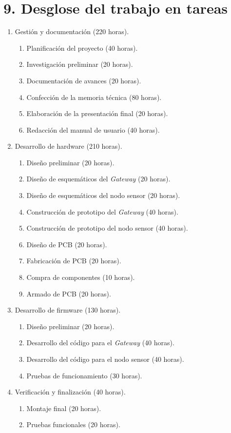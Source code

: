 \documentclass[
11pt, %
]{charter}
\begin{document}
\section{9. Desglose del trabajo en tareas}
\label{sec:wbs}


\begin{enumerate}
\item Gestión y documentación (220 horas).
	\begin{enumerate}
	\item Planificación del proyecto (40 horas).
	\item Investigación preliminar (20 horas).
	\item Documentación de avances (20 horas).
	\item Confección de la memoria técnica (80 horas).
	\item Elaboración de la presentación final (20 horas).
	\item Redacción del manual de usuario (40 horas).
	\end{enumerate}
\item Desarrollo de hardware (210 horas).
	\begin{enumerate}
	\item Diseño preliminar (20 horas).
	\item Diseño de esquemáticos del \textit{Gateway} (20 horas).
	\item Diseño de esquemáticos del nodo sensor (20 horas).
	\item Construcción de prototipo del \textit{Gateway} (40 horas).
	\item Construcción de prototipo del nodo sensor (40 horas).
	\item Diseño de PCB (20 horas).
	\item Fabricación de PCB (20 horas).
	\item Compra de componentes (10 horas).
	\item Armado de PCB (20 horas).
	\end{enumerate}
\item Desarrollo de firmware (130 horas).
	\begin{enumerate}
	\item Diseño preliminar (20 horas).
	\item Desarrollo del código para el \textit{Gateway} (40 horas).
	\item Desarrollo del código para el nodo sensor (40 horas).
	\item Pruebas de funcionamiento (30 horas).
	\end{enumerate}
\item Verificación y finalización (40 horas).
	\begin{enumerate}
	\item Montaje final (20 horas).
	\item Pruebas funcionales (20 horas).
	\end{enumerate}
\end{enumerate}
\end{document}
